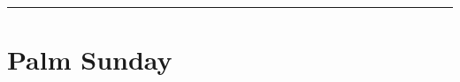 {{{\printcommemnote{}
}

\bigskip
\hrule
\medskip
{
\section{Palm Sunday}
\label{lent6}\label{palmsunday}
\printcommonvespers[1]
\renewcommand{\printhymnnote}{
	\noindent\printnote{Hymn.~\emph{Vexílla Regis}, page \pageref{hymn-vexillaregis}.
	\Vbar~\emph{Eripe me, Dómine}, page \pageref{vr-eripeme}.}
}

\bigskip
\benedicamusdomino{}
}

}
}